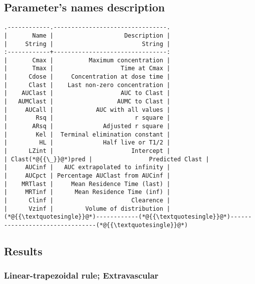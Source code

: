 \documentclass[12pt,a4paper]{article}
\begin{document}
\subsection{Parameter's names description}

\begin{lstlisting}
.------------.--------------------------------.
|       Name |                    Description |
|     String |                         String |
:------------+--------------------------------:
|       Cmax |          Maximum concentration |
|       Tmax |                   Time at Cmax |
|      Cdose |     Concentration at dose time |
|      Clast |    Last non-zero concentration |
|    AUClast |                   AUC to Clast |
|   AUMClast |                  AUMC to Clast |
|     AUCall |            AUC with all values |
|        Rsq |                       r square |
|       ARsq |              Adjusted r square |
|        Kel |  Terminal elimination constant |
|         HL |              Half live or T1/2 |
|      LZint |                      Intercept |
| Clast(*@{{\_}}@*)pred |                Predicted Clast |
|     AUCinf |   AUC extrapolated to infinity |
|     AUCpct | Percentage AUClast from AUCinf |
|    MRTlast |     Mean Residence Time (last) |
|     MRTinf |      Mean Residence Time (inf) |
|      Clinf |                      Clearence |
|      Vzinf |         Volume of distribution |
(*@{{\textquotesingle}}@*)------------(*@{{\textquotesingle}}@*)--------------------------------(*@{{\textquotesingle}}@*)
\end{lstlisting}


\subsection{Results}
\subsubsection{Linear-trapezoidal rule; Extravascular}
\end{document}
